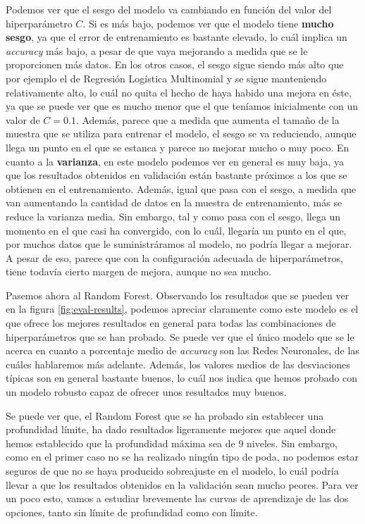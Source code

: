 \documentclass[11pt,a4paper]{article}
\begin{document}
Podemos ver que el sesgo del modelo va cambiando en función del valor del hiperparámetro $C$. Si es más bajo, podemos ver que el modelo tiene \textbf{mucho
sesgo}, ya que el error de entrenamiento es bastante elevado, lo cuál implica un \textit{accuracy} más bajo, a pesar de que vaya mejorando a
medida que se le proporcionen más datos. En los otros casos, el sesgo sigue siendo más alto que por ejemplo el de Regresión Logística Multinomial
y se sigue manteniendo relativamente alto, lo cuál no quita el hecho de haya habido una mejora en éste, ya que se puede ver que es mucho menor
que el que teníamos inicialmente con un valor de $C = 0.1$. Además, parece que a medida que aumenta el tamaño de la muestra que se utiliza para
entrenar el modelo, el sesgo se va reduciendo, aunque llega un punto en el que se estanca y parece no mejorar mucho o muy poco.
En cuanto a la \textbf{varianza}, en este modelo podemos ver en general es muy baja, ya que los resultados obtenidos en validación están bastante
próximos a los que se obtienen en el entrenamiento. Además, igual que pasa con el sesgo, a medida que van aumentando la cantidad de datos en la
muestra de entrenamiento, más se reduce la varianza media. Sin embargo, tal y como pasa con el sesgo, llega un momento en el que casi ha convergido, con lo cuál, llegaría un punto en el que, por muchos datos que le suministráramos al modelo, no podría llegar a mejorar. A pesar de
eso, parece que con la configuración adecuada de hiperparámetros, tiene todavía cierto margen de mejora, aunque no sea mucho.

Pasemos ahora al Random Forest. Observando los resultados que se pueden ver en la figura \ref{fig:eval-results}, podemos apreciar claramente como
este modelo es el que ofrece los mejores resultados en general para todas las combinaciones de hiperparámetros que se han probado. Se puede ver que
el único modelo que se le acerca en cuanto a porcentaje medio de \textit{accuracy} son las Redes Neuronales, de las cuáles hablaremos más adelante.
Además, los valores medios de las desviaciones típicas son en general bastante buenos, lo cuál nos indica que hemos probado con un modelo robusto
capaz de ofrecer unos resultados muy buenos.

Se puede ver que, el Random Forest que se ha probado sin establecer una profundidad límite, ha dado resultados ligeramente mejores que aquel donde
hemos establecido que la profundidad máxima sea de 9 niveles. Sin embargo, como en el primer caso no se ha realizado ningún tipo de poda, no
podemos estar seguros de que no se haya producido sobreajuste en el modelo, lo cuál podría llevar a que los resultados obtenidos en la validación
sean mucho peores. Para ver un poco esto, vamos a estudiar brevemente las curvas de aprendizaje de las dos opciones, tanto sin límite de profundidad
como con límite.
\end{document}
